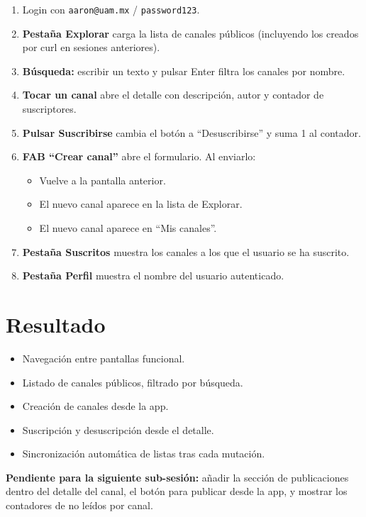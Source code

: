 \begin{enumerate}[leftmargin=*]
  \item Login con \texttt{aaron@uam.mx} / \texttt{password123}.
  \item \textbf{Pestaña Explorar} carga la lista de canales públicos (incluyendo los creados por curl en sesiones anteriores).
  \item \textbf{Búsqueda:} escribir un texto y pulsar Enter filtra los canales por nombre.
  \item \textbf{Tocar un canal} abre el detalle con descripción, autor y contador de suscriptores.
  \item \textbf{Pulsar Suscribirse} cambia el botón a ``Desuscribirse'' y suma 1 al contador.
  \item \textbf{FAB ``Crear canal''} abre el formulario. Al enviarlo:
    \begin{itemize}
      \item Vuelve a la pantalla anterior.
      \item El nuevo canal aparece en la lista de Explorar.
      \item El nuevo canal aparece en ``Mis canales''.
    \end{itemize}
  \item \textbf{Pestaña Suscritos} muestra los canales a los que el usuario se ha suscrito.
  \item \textbf{Pestaña Perfil} muestra el nombre del usuario autenticado.
\end{enumerate}

\section{Resultado}

\begin{exito}
\begin{itemize}[leftmargin=*]
  \item Navegación entre pantallas funcional.
  \item Listado de canales públicos, filtrado por búsqueda.
  \item Creación de canales desde la app.
  \item Suscripción y desuscripción desde el detalle.
  \item Sincronización automática de listas tras cada mutación.
\end{itemize}
\end{exito}

\textbf{Pendiente para la siguiente sub-sesión:} añadir la sección de publicaciones dentro del detalle del canal, el botón para publicar desde la app, y mostrar los contadores de no leídos por canal.